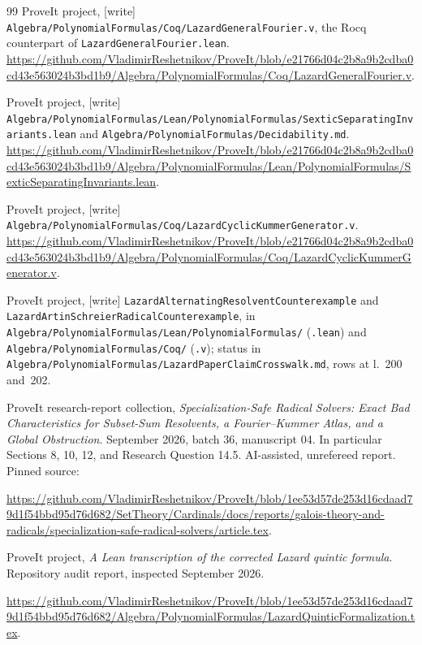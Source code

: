 \documentclass[11pt,a4paper]{article}
\theoremstyle{definition}
\theoremstyle{remark}
\newcommand{\code}[1]{{\small\nolinkurl{#1}}}
\begin{document}
\begin{thebibliography}{99}
ProveIt project, [write]
\code{Algebra/PolynomialFormulas/Coq/LazardGeneralFourier.v}, the Rocq
counterpart of \code{LazardGeneralFourier.lean}.
\url{https://github.com/VladimirReshetnikov/ProveIt/blob/e21766d04c2b8a9b2cdba0cd43e563024b3bd1b9/Algebra/PolynomialFormulas/Coq/LazardGeneralFourier.v}.

ProveIt project, [write]
\code{Algebra/PolynomialFormulas/Lean/PolynomialFormulas/SexticSeparatingInvariants.lean}
and \code{Algebra/PolynomialFormulas/Decidability.md}.
\url{https://github.com/VladimirReshetnikov/ProveIt/blob/e21766d04c2b8a9b2cdba0cd43e563024b3bd1b9/Algebra/PolynomialFormulas/Lean/PolynomialFormulas/SexticSeparatingInvariants.lean}.

ProveIt project, [write]
\code{Algebra/PolynomialFormulas/Coq/LazardCyclicKummerGenerator.v}.
\url{https://github.com/VladimirReshetnikov/ProveIt/blob/e21766d04c2b8a9b2cdba0cd43e563024b3bd1b9/Algebra/PolynomialFormulas/Coq/LazardCyclicKummerGenerator.v}.

ProveIt project, [write]
\code{LazardAlternatingResolventCounterexample} and
\code{LazardArtinSchreierRadicalCounterexample}, in
\code{Algebra/PolynomialFormulas/Lean/PolynomialFormulas/} (\code{.lean}) and
\code{Algebra/PolynomialFormulas/Coq/} (\code{.v}); status in
\code{Algebra/PolynomialFormulas/LazardPaperClaimCrosswalk.md}, rows at
l.~200 and~202.

ProveIt research-report collection,
\emph{Specialization-Safe Radical Solvers: Exact Bad Characteristics for
Subset-Sum Resolvents, a Fourier--Kummer Atlas, and a Global Obstruction}.
September 2026, batch 36, manuscript 04. In particular Sections 8, 10,
12, and Research Question 14.5. AI-assisted, unrefereed report.
Pinned source:\par
\url{https://github.com/VladimirReshetnikov/ProveIt/blob/1ee53d57de253d16cdaad79d1f54bbd95d76d682/SetTheory/Cardinals/docs/reports/galois-theory-and-radicals/specialization-safe-radical-solvers/article.tex}.

ProveIt project,
\emph{A Lean transcription of the corrected Lazard quintic formula}.
Repository audit report, inspected September 2026.\par
\url{https://github.com/VladimirReshetnikov/ProveIt/blob/1ee53d57de253d16cdaad79d1f54bbd95d76d682/Algebra/PolynomialFormulas/LazardQuinticFormalization.tex}.


\end{thebibliography}
\end{document}
